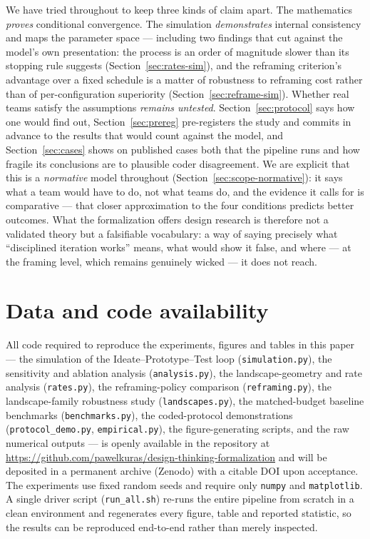 \documentclass[11pt]{article}
\begin{document}
We have tried throughout to keep three kinds of claim apart. The mathematics \emph{proves} conditional convergence. The simulation \emph{demonstrates} internal consistency and maps the parameter space --- including two findings that cut against the model's own presentation: the process is an order of magnitude slower than its stopping rule suggests (Section~\ref{sec:rates-sim}), and the reframing criterion's advantage over a fixed schedule is a matter of robustness to reframing cost rather than of per-configuration superiority (Section~\ref{sec:reframe-sim}). Whether real teams satisfy the assumptions \emph{remains untested}. Section~\ref{sec:protocol} says how one would find out, Section~\ref{sec:prereg} pre-registers the study and commits in advance to the results that would count against the model, and Section~\ref{sec:cases} shows on published cases both that the pipeline runs and how fragile its conclusions are to plausible coder disagreement. We are explicit that this is a \emph{normative} model throughout (Section~\ref{sec:scope-normative}): it says what a team would have to do, not what teams do, and the evidence it calls for is comparative --- that closer approximation to the four conditions predicts better outcomes. What the formalization offers design research is therefore not a validated theory but a falsifiable vocabulary: a way of saying precisely what ``disciplined iteration works'' means, what would show it false, and where --- at the framing level, which remains genuinely wicked --- it does not reach.

\section*{Data and code availability}
All code required to reproduce the experiments, figures and tables in this paper --- the simulation of the Ideate--Prototype--Test loop (\texttt{simulation.py}), the sensitivity and ablation analysis (\texttt{analysis.py}), the landscape-geometry and rate analysis (\texttt{rates.py}), the reframing-policy comparison (\texttt{reframing.py}), the landscape-family robustness study (\texttt{landscapes.py}), the matched-budget baseline benchmarks (\texttt{benchmarks.py}), the coded-protocol demonstrations (\texttt{protocol\_demo.py}, \texttt{empirical.py}), the figure-generating scripts, and the raw numerical outputs --- is openly available in the repository at \url{https://github.com/pawelkuras/design-thinking-formalization} and will be deposited in a permanent archive (Zenodo) with a citable DOI upon acceptance. The experiments use fixed random seeds and require only \texttt{numpy} and \texttt{matplotlib}. A single driver script (\texttt{run\_all.sh}) re-runs the entire pipeline from scratch in a clean environment and regenerates every figure, table and reported statistic, so the results can be reproduced end-to-end rather than merely inspected.
\end{document}
